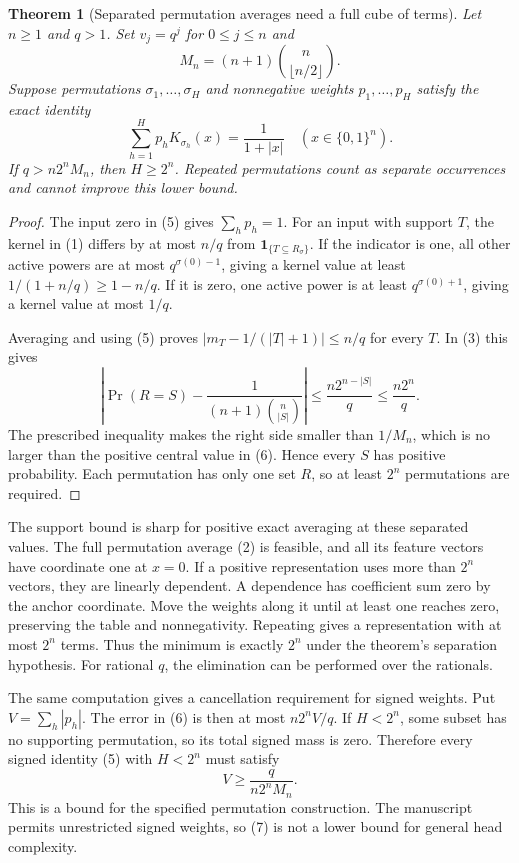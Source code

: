 \documentclass[11pt]{article}
\newtheorem{theorem}{Theorem}
\begin{document}
\begin{theorem}[Separated permutation averages need a full cube of terms]
Let $n\ge1$ and $q>1$. Set $v_j=q^j$ for $0\le j\le n$ and
\[
             M_n=(n+1)\binom n{\lfloor n/2\rfloor}.
\]
Suppose permutations $\sigma_1,\ldots,\sigma_H$ and nonnegative
weights $p_1,\ldots,p_H$ satisfy the exact identity
\[
           \sum_{h=1}^H p_h K_{\sigma_h}(x)=\frac1{1+|x|}
                   \quad(x\in\{0,1\}^n).
 \tag{5}
\]
If $q>n2^n M_n$, then $H\ge2^n$. Repeated permutations count as
separate occurrences and cannot improve this lower bound.
\end{theorem}
\begin{proof}
The input zero in (5) gives $\sum_h p_h=1$. For an input with
support $T$, the kernel in (1) differs by at most $n/q$ from
$\mathbf1_{\{T\subseteq R_\sigma\}}$. If the indicator is one,
all other active powers are at most $q^{\sigma(0)-1}$, giving a
kernel value at least $1/(1+n/q)\ge1-n/q$. If it is zero,
one active power is at least $q^{\sigma(0)+1}$, giving a kernel
value at most $1/q$.

Averaging and using (5) proves
$|m_T-1/(|T|+1)|\le n/q$ for every $T$. In (3) this gives
\[
 \left|\Pr(R=S)-\frac1{(n+1)\binom n{|S|}}\right|
                 \le\frac{n2^{n-|S|}}q\le\frac{n2^n}q.
 \tag{6}
\]
The prescribed inequality makes the right side smaller than $1/M_n$,
which is no larger than the positive central value in (6). Hence every
$S$ has positive probability. Each permutation has only one set $R$,
so at least $2^n$ permutations are required.
\end{proof}

The support bound is sharp for positive exact averaging at these
separated values. The full permutation average (2) is feasible, and
all its feature vectors have coordinate one at $x=0$. If a positive
representation uses more than $2^n$ vectors, they are linearly
dependent. A dependence has coefficient sum zero by the anchor
coordinate. Move the weights along it until at least one reaches
zero, preserving the table and nonnegativity. Repeating gives a
representation with at most $2^n$ terms. Thus the minimum is exactly
$2^n$ under the theorem's separation hypothesis. For rational $q$,
the elimination can be performed over the rationals.

The same computation gives a cancellation requirement for signed
weights. Put $V=\sum_h|p_h|$. The error in (6) is then at most
$n2^n V/q$. If $H<2^n$, some subset has no supporting permutation,
so its total signed mass is zero. Therefore every signed identity
(5) with $H<2^n$ must satisfy
\[
                         V\ge\frac{q}{n2^n M_n}.
 \tag{7}
\]
This is a bound for the specified permutation construction. The
manuscript permits unrestricted signed weights, so (7) is not a
lower bound for general head complexity.
\end{document}

